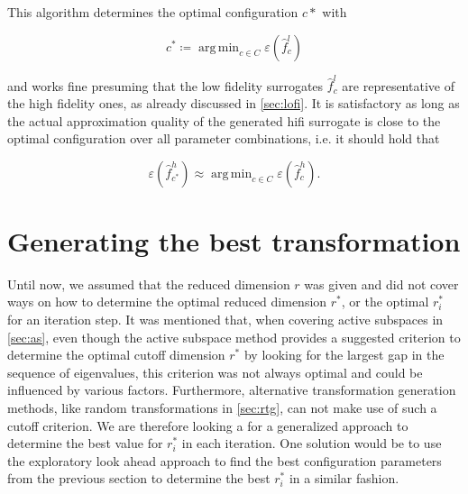 \documentclass[
  a4paper,  %
  twoside,  %
  bibliography=totoc,
  headsepline,
  cleardoublepage=empty,
  parskip=half,
  draft=false
]{scrbook}
\DeclareMathOperator*{\argmin}{arg\,min}
\begin{document}
This algorithm determines the optimal configuration $c*$ with

\begin{equation}
c^\ast \coloneqq \argmin_{c \in C} \varepsilon(\hat{f}_c^l)
\nonumber
\end{equation}

and works fine presuming that the low fidelity surrogates $\hat{f}_c^l$ are representative of the high fidelity ones, as already discussed in \cref{sec:lofi}.
It is satisfactory as long as the actual approximation quality of the generated hifi surrogate is close to the optimal configuration over all parameter combinations, i.e. it should hold that

\begin{equation}
\varepsilon(\hat{f}_{c^\ast}^h) \approx \argmin_{c \in C} \varepsilon(\hat{f}_c^h).
\nonumber
\end{equation}

\section{Generating the best transformation}

Until now, we assumed that the reduced dimension $r$ was given and did not cover ways on how to determine the optimal reduced dimension $r^\ast$, or the optimal $r^\ast_i$ for an iteration step.
It was mentioned that, when covering active subspaces in \cref{sec:as}, even though the active subspace method provides a suggested criterion to determine the optimal cutoff dimension $r^\ast$ by looking for the largest gap in the sequence of eigenvalues, this criterion was not always optimal and could be influenced by various factors.
Furthermore, alternative transformation generation methods, like random transformations in \cref{sec:rtg}, can not make use of such a cutoff criterion.
We are therefore looking a for a generalized approach to determine the best value for $r^\ast_i$ in each iteration.
One solution would be to use the exploratory look ahead approach to find the best configuration parameters from the previous section to determine the best $r^\ast_i$ in a similar fashion.

\newpage
\end{document}
